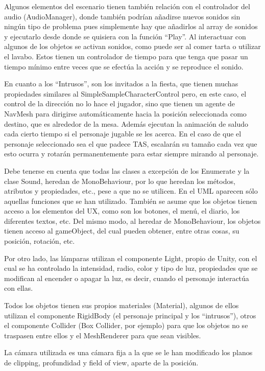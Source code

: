 \documentclass[12pt, a4paper,twoside,titlepage]{book}
\begin{document}
Algunos elementos del escenario tienen también relación con el controlador del audio (AudioManager), donde también podrían añadirse nuevos sonidos sin ningún tipo de problema pues simplemente hay que añadirlos al array de sonidos y ejecutarlo desde donde se quisiera con la función ``Play''. Al interactuar con algunos de los objetos se activan sonidos, como puede ser al comer tarta o utilizar el lavabo. Estos tienen un controlador de tiempo para que tenga que pasar un tiempo mínimo entre veces que se efectúa la acción y se reproduce el sonido. 

En cuanto a los ``Intrusos'', son los invitados a la fiesta, que tienen muchas propiedades similares al SimpleSampleCharacterControl pero, en este caso, el control de la dirección no lo hace el jugador, sino que tienen un agente de NavMesh para dirigirse automáticamente hacia la posición seleccionada como destino, que es alrededor de la mesa. Además ejecutan la animación de saludo cada cierto tiempo si el personaje jugable se les acerca. En el caso de que el personaje seleccionado sea el que padece TAS, escalarán su tamaño cada vez que esto ocurra y rotarán permanentemente para estar siempre mirando al personaje.  

 Debe tenerse en cuenta que todas las clases a excepción de los Enumerate y la clase Sound, heredan de MonoBehaviour, por lo que heredan los métodos, atributos y propiedades, etc., pese a que no se utilicen. En el UML aparecen sólo aquellas funciones que se han utilizado. También se asume que los objetos tienen acceso a los elementos del UX, como son los botones, el menú, el diario, los diferentes textos, etc. Del mismo modo, al heredar de MonoBehaviour, los objetos tienen acceso al gameObject, del cual pueden obtener, entre otras cosas, su posición, rotación, etc. 

Por otro lado, las lámparas utilizan el componente Light, propio de Unity, con el cual se ha controlado la intensidad, radio, color y tipo de luz, propiedades que se modifican al encender o apagar la luz, es decir, cuando el personaje interactúa con ellas. 

Todos los objetos tienen sus propios materiales (Material), algunos de ellos utilizan el componente RigidBody (el personaje principal y los ``intrusos''), otros el componente Collider (Box Collider, por ejemplo) para que los objetos no se traspasen entre ellos y el MeshRenderer para que sean visibles.

La cámara utilizada es una cámara fija a la que se le han modificado los planos de clipping, profundidad y field of view, aparte de la posición. 
\end{document}
